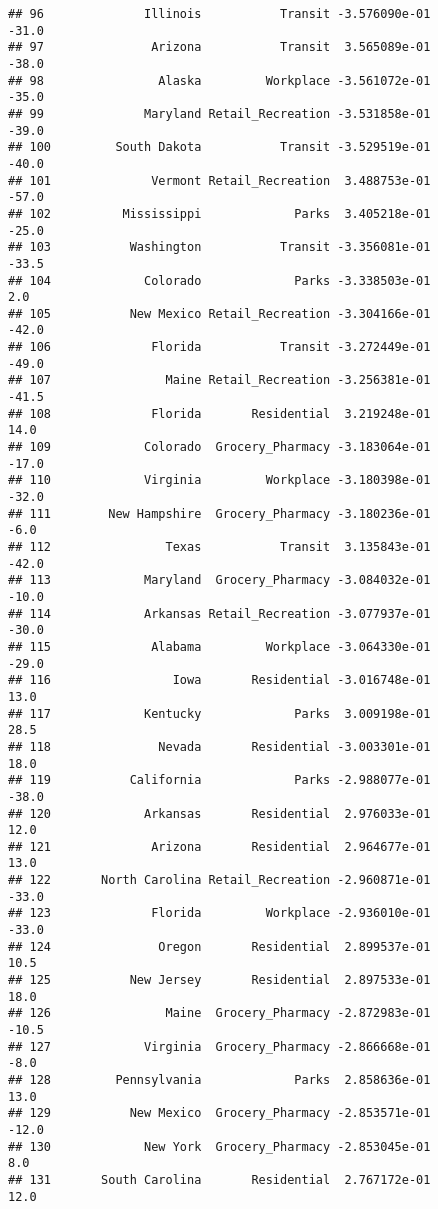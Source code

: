 \documentclass[]{article}
\begin{document}
\begin{verbatim}
## 96              Illinois           Transit -3.576090e-01         -31.0
## 97               Arizona           Transit  3.565089e-01         -38.0
## 98                Alaska         Workplace -3.561072e-01         -35.0
## 99              Maryland Retail_Recreation -3.531858e-01         -39.0
## 100         South Dakota           Transit -3.529519e-01         -40.0
## 101              Vermont Retail_Recreation  3.488753e-01         -57.0
## 102          Mississippi             Parks  3.405218e-01         -25.0
## 103           Washington           Transit -3.356081e-01         -33.5
## 104             Colorado             Parks -3.338503e-01           2.0
## 105           New Mexico Retail_Recreation -3.304166e-01         -42.0
## 106              Florida           Transit -3.272449e-01         -49.0
## 107                Maine Retail_Recreation -3.256381e-01         -41.5
## 108              Florida       Residential  3.219248e-01          14.0
## 109             Colorado  Grocery_Pharmacy -3.183064e-01         -17.0
## 110             Virginia         Workplace -3.180398e-01         -32.0
## 111        New Hampshire  Grocery_Pharmacy -3.180236e-01          -6.0
## 112                Texas           Transit  3.135843e-01         -42.0
## 113             Maryland  Grocery_Pharmacy -3.084032e-01         -10.0
## 114             Arkansas Retail_Recreation -3.077937e-01         -30.0
## 115              Alabama         Workplace -3.064330e-01         -29.0
## 116                 Iowa       Residential -3.016748e-01          13.0
## 117             Kentucky             Parks  3.009198e-01          28.5
## 118               Nevada       Residential -3.003301e-01          18.0
## 119           California             Parks -2.988077e-01         -38.0
## 120             Arkansas       Residential  2.976033e-01          12.0
## 121              Arizona       Residential  2.964677e-01          13.0
## 122       North Carolina Retail_Recreation -2.960871e-01         -33.0
## 123              Florida         Workplace -2.936010e-01         -33.0
## 124               Oregon       Residential  2.899537e-01          10.5
## 125           New Jersey       Residential  2.897533e-01          18.0
## 126                Maine  Grocery_Pharmacy -2.872983e-01         -10.5
## 127             Virginia  Grocery_Pharmacy -2.866668e-01          -8.0
## 128         Pennsylvania             Parks  2.858636e-01          13.0
## 129           New Mexico  Grocery_Pharmacy -2.853571e-01         -12.0
## 130             New York  Grocery_Pharmacy -2.853045e-01           8.0
## 131       South Carolina       Residential  2.767172e-01          12.0

\end{verbatim}
\end{document}
